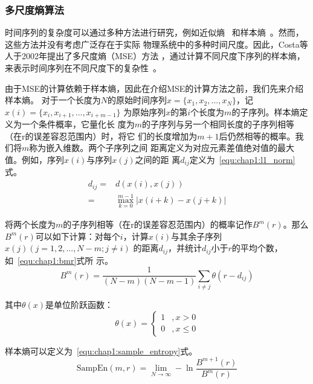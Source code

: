 \subsubsection{多尺度熵算法}

时间序列的复杂度可以通过多种方法进行研究，例如近似熵~\cite{valenza2014inhomogeneous}
和样本熵~\cite{yentes2013appropriate}。然而，这些方法并没有考虑广泛存在于实际
物理系统中的多种时间尺度。因此，Costa等人于2002年提出了多尺度熵（MSE）方法
，通过计算不同尺度下序列的样本熵，来表示时间序列在不同尺度下的复杂性~\cite{costa2002multiscale}。

由于MSE的计算依赖于样本熵，因此在介绍MSE的计算方法之前，我们先来介绍样本熵。
对于一个长度为$N$的原始时间序列$x=\{x_1, x_2, ..., x_N\}$，记$x(i)=\{x_i, x_{i+1}, ..., x_{i+m-1}\}$
为原始序列$x$的第$i$个长度为$m$的子序列。样本熵定义为一个条件概率，它量化长
度为$m$的子序列与另一个相同长度的子序列相等（在r的误差容忍范围内）时，将它
们的长度增加为$m+1$后仍然相等的概率。我们将$m$称为嵌入维数。两个子序列之间
距离定义为对应元素差值绝对值的最大值。例如，序列$x(i)$与序列$x(j)$之间的距
离$d_{ij}$定义为~\ref{equ:chap1:l1_norm}式。
\begin{equation}
  \label{equ:chap1:l1_norm}
  \begin{aligned}
    d_{ij} = & d(x(i), x(j)) \\
    = & \max_{k=0}^{m-1}|x(i+k)-x(j+k)|
  \end{aligned}
\end{equation}

将两个长度为$m$的子序列相等（在r的误差容忍范围内）的概率记作$B^m(r)$。那么
$B^m(r)$可以如下计算：对每个$i$，计算$x(i)$与其余子序列$x(j)(j=1,2,...,N-m; j\neq i)$
的距离$d_{ij}$，并统计$d_{ij}$小于$r$的平均个数，如~\ref{equ:chap1:bmr}式所
示。
\begin{equation}
  \label{equ:chap1:bmr}
  B^m(r)=\frac{1}{(N-m)(N-m-1)}\sum_{i\neq j}\theta(r-d_{ij})
\end{equation}

其中$\theta(x)$是单位阶跃函数：
\begin{equation}
  \label{equ:chap1:step_func}
  \theta(x) = \left\{
  \begin{aligned}
    1 &, x > 0 \\
    0 &, x \leq 0
  \end{aligned}
  \right.
\end{equation}

样本熵可以定义为~\ref{equ:chap1:sample_entropy}式。
\begin{equation}
  \label{equ:chap1:sample_entropy}
  \text{SampEn}(m, r) = \lim_{N\to\infty}-\ln\frac{B^{m+1}(r)}{B^m(r)}
\end{equation}

